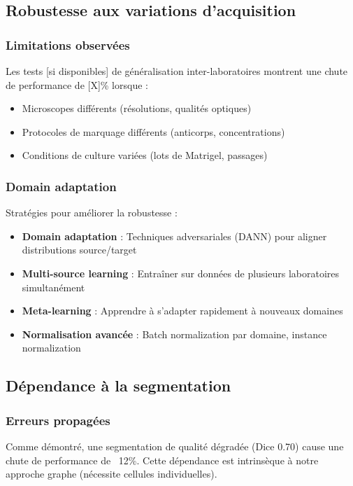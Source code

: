\subsection{Robustesse aux variations d'acquisition}

\subsubsection{Limitations observées}

Les tests [si disponibles] de généralisation inter-laboratoires montrent une chute de performance de [X]\% lorsque :
\begin{itemize}
    \item Microscopes différents (résolutions, qualités optiques)
    \item Protocoles de marquage différents (anticorps, concentrations)
    \item Conditions de culture variées (lots de Matrigel, passages)
\end{itemize}

\subsubsection{Domain adaptation}

Stratégies pour améliorer la robustesse :
\begin{itemize}
    \item \textbf{Domain adaptation} : Techniques adversariales (DANN) pour aligner distributions source/target
    \item \textbf{Multi-source learning} : Entraîner sur données de plusieurs laboratoires simultanément
    \item \textbf{Meta-learning} : Apprendre à s'adapter rapidement à nouveaux domaines
    \item \textbf{Normalisation avancée} : Batch normalization par domaine, instance normalization
\end{itemize}

\subsection{Dépendance à la segmentation}

\subsubsection{Erreurs propagées}

Comme démontré, une segmentation de qualité dégradée (Dice 0.70) cause une chute de performance de ~12\%. Cette dépendance est intrinsèque à notre approche graphe (nécessite cellules individuelles).

